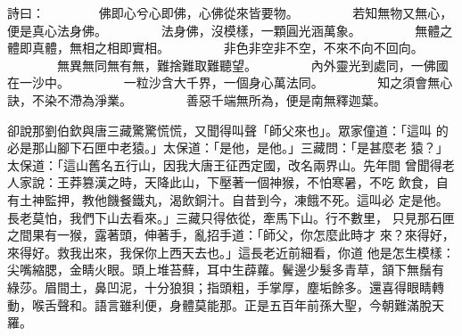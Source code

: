\begin{pinyinscope}
{詩曰：
　　　　佛即心兮心即佛，心佛從來皆要物。
　　　　若知無物又無心，便是真心法身佛。
　　　　法身佛，沒模樣，一顆圓光涵萬象。
　　　　無體之體即真體，無相之相即實相。
　　　　非色非空非不空，不來不向不回向。
　　　　無異無同無有無，難捨難取難聽望。
　　　　內外靈光到處同，一佛國在一沙中。
　　　　一粒沙含大千界，一個身心萬法同。
　　　　知之須會無心訣，不染不滯為淨業。
　　　　善惡千端無所為，便是南無釋迦葉。

卻說那劉伯欽與唐三藏驚驚慌慌，又聞得叫聲「師父來也」。眾家僮道：「這叫
的必是那山腳下石匣中老猿。」太保道：「是他，是他。」三藏問：「是甚麼老
猿？」太保道：「這山舊名五行山，因我大唐王征西定國，改名兩界山。先年間
曾聞得老人家說：王莽篡漢之時，天降此山，下壓著一個神猴，不怕寒暑，不吃
飲食，自有土神監押，教他饑餐鐵丸，渴飲銅汁。自昔到今，凍餓不死。這叫必
定是他。長老莫怕，我們下山去看來。」三藏只得依從，牽馬下山。行不數里，
只見那石匣之間果有一猴，露著頭，伸著手，亂招手道：「師父，你怎麼此時才
來？來得好，來得好。救我出來，我保你上西天去也。」這長老近前細看，你道
他是怎生模樣：
尖嘴縮腮，金睛火眼。頭上堆苔蘚，耳中生薜蘿。鬢邊少髮多青草，頷下無鬚有
綠莎。眉間土，鼻凹泥，十分狼狽；指頭粗，手掌厚，塵垢餘多。還喜得眼睛轉
動，喉舌聲和。語言雖利便，身體莫能那。正是五百年前孫大聖，今朝難滿脫天
羅。

}
\end{pinyinscope}
